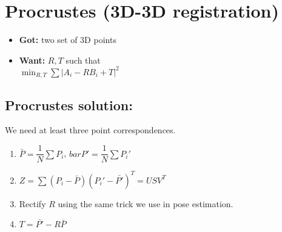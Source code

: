 \section{Procrustes (3D-3D registration)}
\begin{itemize}
  \item \textbf{Got:} two set of 3D points
  \item \textbf{Want:} $R, T$ such that\\
    $\min_{R,T} \sum |A_i - R B_i +T|^2$
\end{itemize}

\subsection*{Procrustes solution:}
\alert{We need at least three point correspondences}.
\begin{enumerate}
  \item $\bar{P} = \dfrac{1}{N} \sum P_i$,
    $bar{P'} = \dfrac{1}{N} \sum P_i'$\\
  \item $Z = \sum(P_i - \bar{P})(P_i' - \bar{P'})^T = U S V^T$
  \item Rectify $R$ using the same trick we use in pose estimation.
  \item $T = \bar{P'} - R \bar{P}$
\end{enumerate}

% 
% 
% 
% 
% 


